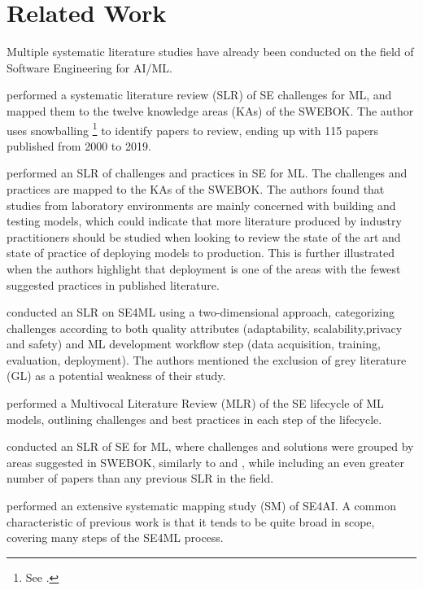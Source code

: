 \chapter{Related Work}
\label{ch:related_work}
Multiple systematic literature studies have already been conducted on the field of Software Engineering for AI/ML.

\textcite{Kumeno2020} performed a systematic literature review (SLR) of SE challenges for ML, and mapped them to the twelve knowledge areas (KAs) of the SWEBOK.
The author uses snowballing \footnote{See \textcite{Wohlin2014}.} to identify papers to review, ending up with 115 papers published from 2000 to 2019.

\textcite{Nascimento2020} performed an SLR of challenges and practices in SE for ML. The challenges and practices are mapped to the KAs of the SWEBOK.
The authors found that studies from laboratory environments are mainly concerned with building and testing models, which could indicate that more literature produced by industry practitioners should be studied when looking to review the state of the art and state of practice of deploying models to production.
This is further illustrated when the authors highlight that deployment is one of the areas with the fewest suggested practices in published literature.

\textcite{Lwakatare2020} conducted an SLR on SE4ML using a two-dimensional approach, categorizing  challenges according to both  quality  attributes  (adaptability, scalability,privacy and safety) and ML development workflow step (data acquisition, training, evaluation, deployment).
The authors mentioned the exclusion of grey  literature (GL) as a potential weakness of their study.


\textcite{John2021} performed a Multivocal Literature Review (MLR) of the SE lifecycle of ML models, outlining challenges and best practices in each step of the lifecycle.

\textcite{Giray2021} conducted an SLR of SE for ML, where challenges and solutions were grouped by areas suggested in SWEBOK, similarly to \cite{Kumeno2020} and \cite{Nascimento2020}, while including an even greater number of papers than any previous SLR in the field.

\textcite{MartinezFernandez2021} performed an extensive systematic mapping study (SM) of SE4AI.
A common characteristic of previous work is that it tends to be quite broad in scope, covering many steps of the SE4ML process.

